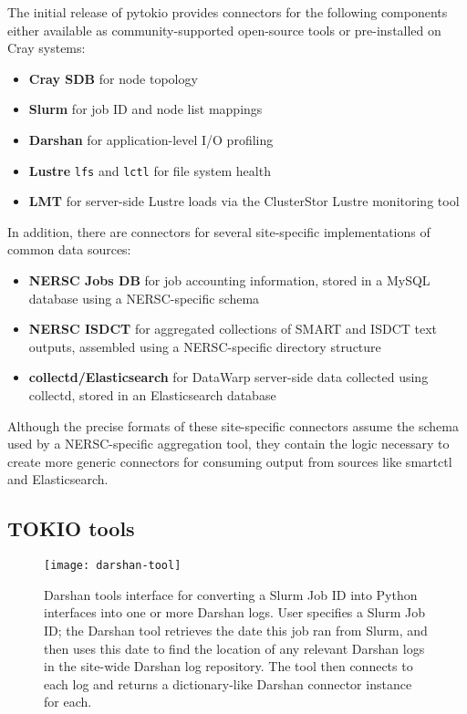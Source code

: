 The initial release of pytokio provides connectors for the following components either available as community-supported open-source tools or pre-installed on Cray systems:

\begin{itemize}
\item \textbf{Cray SDB} for node topology
\item \textbf{Slurm} for job ID and node list mappings
\item \textbf{Darshan} for application-level I/O profiling
\item \textbf{Lustre} \texttt{lfs} and \texttt{lctl} for file system health
\item \textbf{LMT} for server-side Lustre loads via the ClusterStor Lustre monitoring tool~\cite{Keopp2014}
\end{itemize}

In addition, there are connectors for several site-specific implementations of common data sources:

\begin{itemize}
\item \textbf{NERSC Jobs DB} for job accounting information, stored in a MySQL database using a NERSC-specific schema
\item \textbf{NERSC ISDCT} for aggregated collections of SMART and ISDCT text outputs, assembled using a NERSC-specific directory structure
\item \textbf{collectd/Elasticsearch} for DataWarp server-side data collected using collectd, stored in an Elasticsearch database
\end{itemize}

Although the precise formats of these site-specific connectors assume the schema used by a NERSC-specific aggregation tool, they contain the logic necessary to create more generic connectors for consuming output from sources like smartctl and Elasticsearch.

\subsection{TOKIO tools} \label{sec:architecture/tools}

\begin{figure}
    \centering
    \texttt{[image: darshan-tool]}
    \caption{Darshan tools interface for converting a Slurm Job ID into Python interfaces into one or more Darshan logs.
    User specifies a Slurm Job ID; the Darshan tool retrieves the date this job ran from Slurm, and then uses this date to find the location of any relevant Darshan logs in the site-wide Darshan log repository.
    The tool then connects to each log and returns a dictionary-like Darshan connector instance for each.}
    \label{fig:darshan-tool}
    \vspace{-.2in}
\end{figure}

